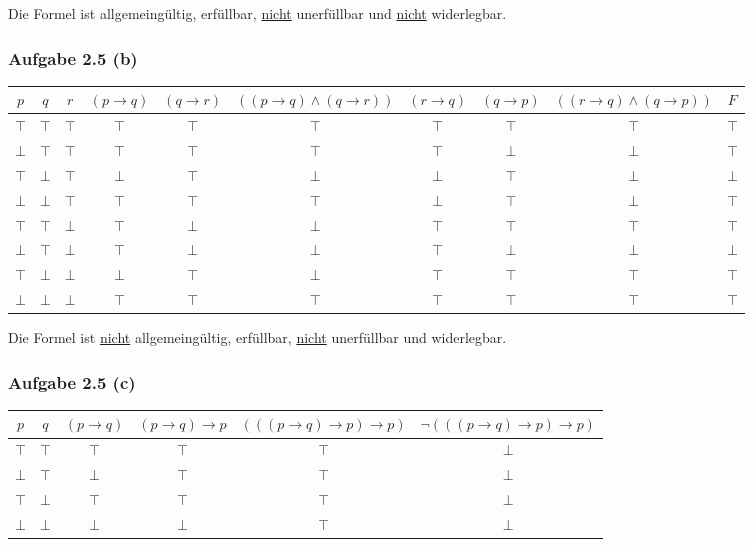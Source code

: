 Die Formel ist allgemeingültig, erfüllbar, \underline{nicht} unerfüllbar und \underline{nicht} widerlegbar.

\subsubsection{Aufgabe 2.5 (b)}
\begin{landscape}
	\begin{tabular}{c|c|c||c|c|c|c|c|c|c}
		$p$ & $q$ & $r$ & $(p\to q)$ & $(q\to r)$ & $((p\to q)\wedge(q\to r))$ & $(r\to q)$ & $(q\to p)$ & $((r\to q)\wedge(q\to p))$ & $F$ \\ \hline
		$\top$ & $\top$ & $\top$ & $\top$ & $\top$ & $\top$ & $\top$ & $\top$ & $\top$ & $\top$\\
		$\bot$ & $\top$ & $\top$ & $\top$ & $\top$ & $\top$ & $\top$ & $\bot$ & $\bot$ & $\top$\\
		$\top$ & $\bot$ & $\top$ & $\bot$ & $\top$ & $\bot$ & $\bot$ & $\top$ & $\bot$ & $\bot$\\
		$\bot$ & $\bot$ & $\top$ & $\top$ & $\top$ & $\top$ & $\bot$ & $\top$ & $\bot$ & $\top$\\ \hline
		$\top$ & $\top$ & $\bot$ & $\top$ & $\bot$ & $\bot$ & $\top$ & $\top$ & $\top$ & $\top$\\
		$\bot$ & $\top$ & $\bot$ & $\top$ & $\bot$ & $\bot$ & $\top$ & $\bot$ & $\bot$ & $\bot$\\
		$\top$ & $\bot$ & $\bot$ & $\bot$ & $\top$ & $\bot$ & $\top$ & $\top$ & $\top$ & $\top$\\
		$\bot$ & $\bot$ & $\bot$ & $\top$ & $\top$ & $\top$ & $\top$ & $\top$ & $\top$ & $\top$
	\end{tabular}
\end{landscape}

Die Formel ist \underline{nicht} allgemeingültig, erfüllbar, \underline{nicht} unerfüllbar und widerlegbar.

\subsubsection{Aufgabe 2.5 (c)}
\begin{tabular}{c|c||c|c|c|c}
	$p$ & $q$ & $(p\to q)$ & $(p\to q)\to p$ & $(((p\to q)\to p)\to p)$ & $\neg(((p\to q)\to p)\to p)$\\ \hline
	$\top$ & $\top$ & $\top$ & $\top$ & $\top$ & $\bot$\\
	$\bot$ & $\top$ & $\bot$ & $\top$ & $\top$ & $\bot$\\
	$\top$ & $\bot$ & $\top$ & $\top$ & $\top$ & $\bot$\\
	$\bot$ & $\bot$ & $\bot$ & $\bot$ & $\top$ & $\bot$
\end{tabular}\\

